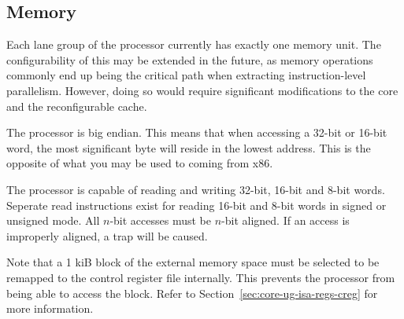 
\subsection{Memory}
\label{sec:core-ug-isa-memory}

Each lane group of the \rvex{} processor currently has exactly one memory unit.
The configurability of this may be extended in the future, as memory operations
commonly end up being the critical path when extracting instruction-level
parallelism. However, doing so would require significant modifications to the
\rvex{} core and the reconfigurable cache.

The \rvex{} processor is big endian. This means that when accessing a 32-bit or 
16-bit word, the most significant byte will reside in the lowest address. This
is the opposite of what you may be used to coming from x86.

The \rvex{} processor is capable of reading and writing 32-bit, 16-bit and 8-bit
words. Seperate read instructions exist for reading 16-bit and 8-bit words in
signed or unsigned mode. All $n$-bit accesses must be $n$-bit aligned. If an
access is improperly aligned, a  trap will be caused.

Note that a 1 kiB block of the external memory space must be selected to be 
remapped to the control register file internally. This prevents the processor 
from being able to access the block. Refer to 
Section~\ref{sec:core-ug-isa-regs-creg} for more information.
